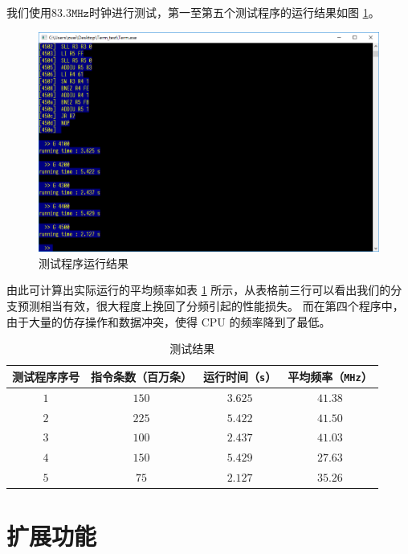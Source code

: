 \documentclass{article}
\begin{document}
我们使用$83.3\texttt{MHz}$时钟进行测试，第一至第五个测试程序的运行结果如图 \ref{fig:result}。

\begin{figure}[ht]
\centering
\includegraphics[width=\textwidth]{figures/result.png}
\caption{测试程序运行结果}
\label{fig:result}
\end{figure}

由此可计算出实际运行的平均频率如表 \ref{tab:performance} 所示，从表格前三行可以看出我们的分支预测相当有效，很大程度上挽回了分频引起的性能损失。
而在第四个程序中，由于大量的仿存操作和数据冲突，使得 CPU 的频率降到了最低。

\begin{table}[ht]
\centering
\caption{测试结果}
\label{tab:performance}
\begin{tabular}{|c|c|c|c|}
\hline
测试程序序号 & 指令条数（百万条） & 运行时间（\texttt{s}） & 平均频率（\texttt{MHz}） \\ \hline
$1$      & $150$       & $3.625$   & $41.38$     \\ \hline
$2$      & $225$       & $5.422$   & $41.50$     \\ \hline
$3$      & $100$       & $2.437$   & $41.03$     \\ \hline
$4$      & $150$       & $5.429$   & $27.63$     \\ \hline
$5$      & $75$        & $2.127$   & $35.26$     \\ \hline
\end{tabular}
\end{table}

\section{扩展功能}
\end{document}

